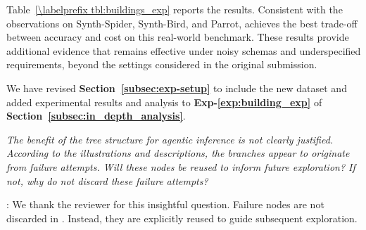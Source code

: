 
Table~\ref{\labelprefix tbl:buildings_exp} reports the results. Consistent with the observations on Synth-Spider, Synth-Bird, and Parrot, \sys achieves the best trade-off between accuracy and cost on this real-world benchmark. These results provide additional evidence that \sys remains effective under noisy schemas and underspecified requirements, beyond the settings considered in the original submission.

{We have revised \textbf{Section~\ref{subsec:exp-setup}} to include the new dataset and added experimental results and analysis to \textbf{Exp-\ref{exp:building_exp}} of \textbf{Section~\ref{subsec:in_depth_analysis}}.}




\begin{shaded}
{
\emph{The benefit of the tree structure for agentic inference is not clearly justified. According to the illustrations and descriptions, the branches appear to originate from failure attempts. Will these nodes be reused to inform future exploration? If not, why do not discard these failure attempts?}
}
\end{shaded}

: 
We thank the reviewer for this insightful question. Failure nodes are not discarded in \sys. Instead, they are explicitly reused to guide subsequent exploration.


